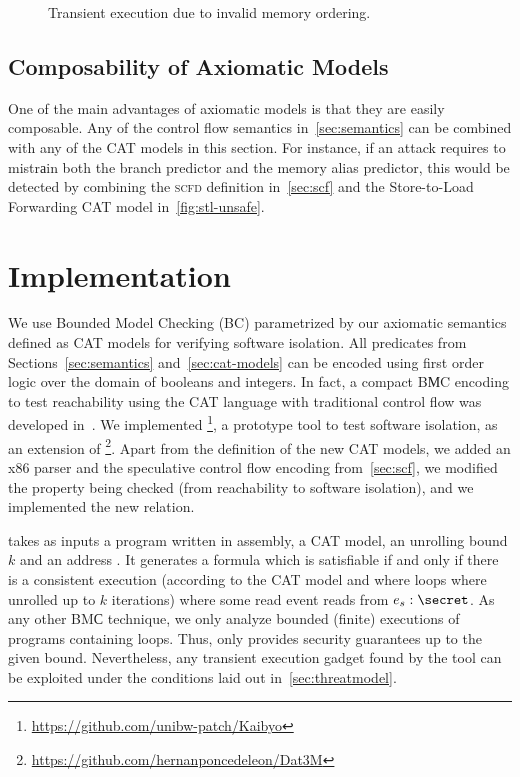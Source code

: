\documentclass[conference]{IEEEtran}
\begin{document}
\begin{figure}[t]
\centering
\scalebox{.8}{}
\caption{Transient execution due to invalid memory ordering.}
\label{fig:concurrency}
\end{figure}

\subsection{Composability of Axiomatic Models}
\label{sec:composability}

One of the main advantages of axiomatic models is that they are easily composable.
Any of the control flow semantics in~\autoref{sec:semantics} can be combined with any of the CAT models in this section.
For instance, if an attack requires to {\selectfont mistr{а}in} both the branch predictor and the memory alias predictor, this would be detected by combining the \textsc{scfd} definition in~\autoref{sec:scf} and the Store-to-Load Forwarding CAT model in~\autoref{fig:stl-unsafe}.

\newcommand\usedtimeout{90 }

\section{Implementation}
\label{sec:framework}

We use Bounded Model Checking ({BC}) parametrized by our axiomatic semantics defined as CAT models for verifying software isolation. 
%
All predicates from Sections~\ref{sec:semantics} and~\ref{sec:cat-models} can be encoded using first order logic over the domain of booleans and integers.
In fact, a compact {\selectfont B{М}C} encoding to test reachability using the CAT language with traditional control flow was developed in~\cite{porthos,dartagnan-cav}.
We implemented \zombmc\footnote{\url{https://github.com/unibw-patch/Kaibyo}}, a prototype tool to test software isolation, as an extension of \dartagnan\footnote{\url{https://github.com/hernanponcedeleon/Dat3M}}.
Apart from the definition of the new CAT models, we added an x86 parser and the speculative control flow encoding from~\autoref{sec:scf}, we modified the property being checked (from reachability to software isolation), and we implemented the new  relation.

\zombmc takes as inputs a program written in \xes assembly, a CAT model, an unrolling bound $k$ and an address \secret.
It generates a formula which is satisfiable if and only if there is a consistent execution (according to the CAT model and where loops where unrolled up to $k$ iterations) where some read event reads from $e_s: \secret$.
As any other {\selectfont BM{С}} technique, we only analyze bounded (finite) executions of programs containing loops.
Thus, \zombmc only provides security guarantees up to the given bound.
Nevertheless, any transient execution gadget found by the tool can be exploited under the conditions laid out in~\autoref{sec:threatmodel}.
\end{document}

